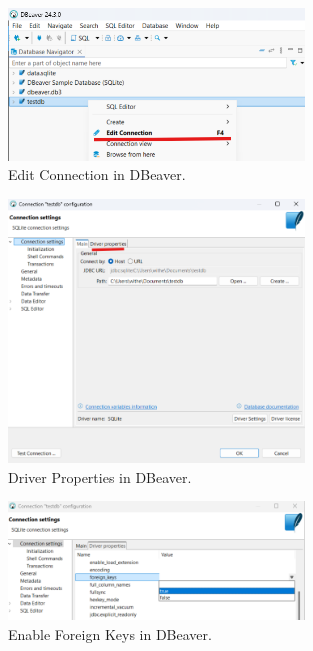\documentclass[a4paper,11pt,oneside]{article}
\begin{document}
\begin{sloppypar}
\begin{figure}[!htb]
  \centering
  \includegraphics[width=0.7\textwidth]{dbeaver/edit_connection.png}
  \caption{Edit Connection in DBeaver.}
  \label{fig:edit_connection}
\end{figure}

\begin{figure}[!htb]
  \centering
  \includegraphics[width=0.7\textwidth]{dbeaver/edit_driver_properties.png}
  \caption{Driver Properties in DBeaver.}
  \label{fig:edit_driver_properties}
\end{figure}

\begin{figure}[!htb]
  \centering
  \includegraphics[width=0.7\textwidth]{dbeaver/edit_foreign_keys_enable.png}
  \caption{Enable Foreign Keys in DBeaver.}
  \label{fig:edit_foreign_keys_enable}
\end{figure}


\end{sloppypar}
\end{document}
